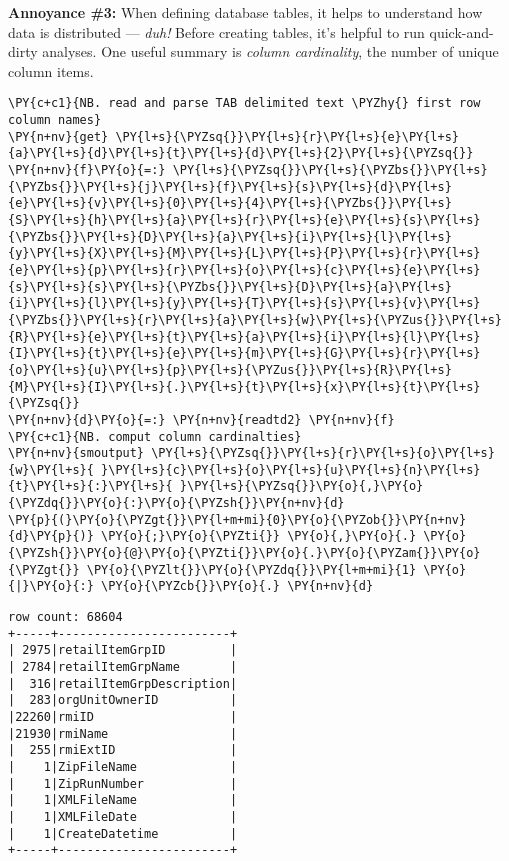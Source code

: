     \textbf{Annoyance \#3:} When defining database tables, it helps to
understand how data is distributed --- \emph{duh!} Before creating
tables, it's helpful to run quick-and-dirty analyses. One useful summary
is \emph{column cardinality}, the number of unique column items.

    \begin{tcolorbox}[breakable, size=fbox, boxrule=1pt, pad at break*=1mm,colback=cellbackground, colframe=cellborder]
\begin{Verbatim}[commandchars=\\\{\}]
\PY{c+c1}{NB. read and parse TAB delimited text \PYZhy{} first row column names}
\PY{n+nv}{get} \PY{l+s}{\PYZsq{}}\PY{l+s}{r}\PY{l+s}{e}\PY{l+s}{a}\PY{l+s}{d}\PY{l+s}{t}\PY{l+s}{d}\PY{l+s}{2}\PY{l+s}{\PYZsq{}}
\PY{n+nv}{f}\PY{o}{=:} \PY{l+s}{\PYZsq{}}\PY{l+s}{\PYZbs{}}\PY{l+s}{\PYZbs{}}\PY{l+s}{j}\PY{l+s}{f}\PY{l+s}{s}\PY{l+s}{d}\PY{l+s}{e}\PY{l+s}{v}\PY{l+s}{0}\PY{l+s}{4}\PY{l+s}{\PYZbs{}}\PY{l+s}{S}\PY{l+s}{h}\PY{l+s}{a}\PY{l+s}{r}\PY{l+s}{e}\PY{l+s}{s}\PY{l+s}{\PYZbs{}}\PY{l+s}{D}\PY{l+s}{a}\PY{l+s}{i}\PY{l+s}{l}\PY{l+s}{y}\PY{l+s}{X}\PY{l+s}{M}\PY{l+s}{L}\PY{l+s}{P}\PY{l+s}{r}\PY{l+s}{e}\PY{l+s}{p}\PY{l+s}{r}\PY{l+s}{o}\PY{l+s}{c}\PY{l+s}{e}\PY{l+s}{s}\PY{l+s}{s}\PY{l+s}{\PYZbs{}}\PY{l+s}{D}\PY{l+s}{a}\PY{l+s}{i}\PY{l+s}{l}\PY{l+s}{y}\PY{l+s}{T}\PY{l+s}{s}\PY{l+s}{v}\PY{l+s}{\PYZbs{}}\PY{l+s}{r}\PY{l+s}{a}\PY{l+s}{w}\PY{l+s}{\PYZus{}}\PY{l+s}{R}\PY{l+s}{e}\PY{l+s}{t}\PY{l+s}{a}\PY{l+s}{i}\PY{l+s}{l}\PY{l+s}{I}\PY{l+s}{t}\PY{l+s}{e}\PY{l+s}{m}\PY{l+s}{G}\PY{l+s}{r}\PY{l+s}{o}\PY{l+s}{u}\PY{l+s}{p}\PY{l+s}{\PYZus{}}\PY{l+s}{R}\PY{l+s}{M}\PY{l+s}{I}\PY{l+s}{.}\PY{l+s}{t}\PY{l+s}{x}\PY{l+s}{t}\PY{l+s}{\PYZsq{}}
\PY{n+nv}{d}\PY{o}{=:} \PY{n+nv}{readtd2} \PY{n+nv}{f}
\PY{c+c1}{NB. comput column cardinalties}
\PY{n+nv}{smoutput} \PY{l+s}{\PYZsq{}}\PY{l+s}{r}\PY{l+s}{o}\PY{l+s}{w}\PY{l+s}{ }\PY{l+s}{c}\PY{l+s}{o}\PY{l+s}{u}\PY{l+s}{n}\PY{l+s}{t}\PY{l+s}{:}\PY{l+s}{ }\PY{l+s}{\PYZsq{}}\PY{o}{,}\PY{o}{\PYZdq{}}\PY{o}{:}\PY{o}{\PYZsh{}}\PY{n+nv}{d}
\PY{p}{(}\PY{o}{\PYZgt{}}\PY{l+m+mi}{0}\PY{o}{\PYZob{}}\PY{n+nv}{d}\PY{p}{)} \PY{o}{;}\PY{o}{\PYZti{}} \PY{o}{,}\PY{o}{.} \PY{o}{\PYZsh{}}\PY{o}{@}\PY{o}{\PYZti{}}\PY{o}{.}\PY{o}{\PYZam{}}\PY{o}{\PYZgt{}} \PY{o}{\PYZlt{}}\PY{o}{\PYZdq{}}\PY{l+m+mi}{1} \PY{o}{|}\PY{o}{:} \PY{o}{\PYZcb{}}\PY{o}{.} \PY{n+nv}{d}
\end{Verbatim}
\end{tcolorbox}

    \begin{Verbatim}[commandchars=\\\{\}]
row count: 68604
+-----+------------------------+
| 2975|retailItemGrpID         |
| 2784|retailItemGrpName       |
|  316|retailItemGrpDescription|
|  283|orgUnitOwnerID          |
|22260|rmiID                   |
|21930|rmiName                 |
|  255|rmiExtID                |
|    1|ZipFileName             |
|    1|ZipRunNumber            |
|    1|XMLFileName             |
|    1|XMLFileDate             |
|    1|CreateDatetime          |
+-----+------------------------+
    \end{Verbatim}

